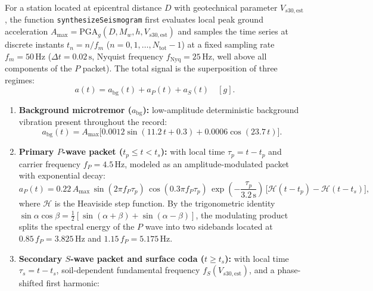 \documentclass[11pt,a4paper]{article}
\newcommand{\unit}[1]{\mathrm{#1}}
\begin{document}
For a station located at epicentral distance $D$ with geotechnical parameter $V_{s30,\mathrm{est}}$, the function
\texttt{synthesizeSeismogram} first evaluates local peak ground acceleration
$A_{\max} = \mathrm{PGA}_g(D, M_w, h, V_{s30,\mathrm{est}})$ and samples the time series at discrete instants
$t_n = n / f_m$ ($n=0,1,\ldots,N_{\mathrm{tot}}-1$) at a fixed sampling rate $f_m = 50\,\unit{Hz}$
($\Delta t = 0.02\,\unit{s}$, Nyquist frequency $f_{\mathrm{Nyq}} = 25\,\unit{Hz}$, well above all components of
the $P$ packet). The total signal is the superposition of three regimes:
\begin{equation}
  a(t) = a_{\mathrm{bg}}(t) + a_P(t) + a_S(t)\quad[g].
  \label{eq:acelerograma-total}
\end{equation}

\begin{enumerate}
  \item \textbf{Background microtremor ($a_{\mathrm{bg}}$):} low-amplitude deterministic background vibration
        present throughout the record:
        \begin{equation}
          a_{\mathrm{bg}}(t) = A_{\max}\bigl[0.0012\sin(11.2\,t + 0.3) + 0.0006\cos(23.7\,t)\bigr].
          \label{eq:sismo-fondo}
        \end{equation}
  \item \textbf{Primary $P$-wave packet ($t_p \le t < t_s$):} with local time $\tau_p = t - t_p$ and carrier
        frequency $f_P = 4.5\,\unit{Hz}$, modeled as an amplitude-modulated packet with exponential decay:
        \begin{equation}
          a_P(t) = 0.22\,A_{\max}\,\sin(2\pi f_P \tau_p)\,\cos(0.3\pi f_P \tau_p)\,
                   \exp\!\left(-\frac{\tau_p}{3.2\,\unit{s}}\right)\,
                   \bigl[\mathcal{H}(t - t_p) - \mathcal{H}(t - t_s)\bigr],
          \label{eq:sismo-onda-p}
        \end{equation}
        where $\mathcal{H}$ is the Heaviside step function. By the trigonometric identity
        $\sin\alpha\cos\beta = \tfrac12[\sin(\alpha+\beta)+\sin(\alpha-\beta)]$, the modulating product splits
        the spectral energy of the $P$ wave into two sidebands located at
        $0.85\,f_P = 3.825\,\unit{Hz}$ and $1.15\,f_P = 5.175\,\unit{Hz}$.
  \item \textbf{Secondary $S$-wave packet and surface coda ($t \ge t_s$):} with local time $\tau_s = t - t_s$,
        soil-dependent fundamental frequency $f_S(V_{s30,\mathrm{est}})$, and a phase-shifted first harmonic:
        \begin{equation}

\end{equation}
\end{enumerate}
\end{document}
